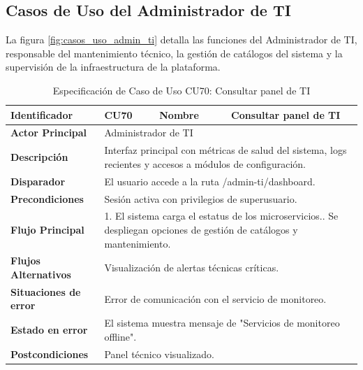 \subsection{Casos de Uso del Administrador de TI}
\label{subsec:casos_uso_admin_ti}

La figura \ref{fig:casos_uso_admin_ti} detalla las funciones del Administrador de TI, responsable del mantenimiento técnico, la gestión de catálogos del sistema y la supervisión de la infraestructura de la plataforma.


\vspace{0.5cm}

\begingroup
\setlength{\parskip}{0pt}
\begin{longtable}{|p{3.5cm}|p{2cm}|p{2.5cm}|p{7cm}|}
\caption{Especificación de Caso de Uso CU70: Consultar panel de TI}
\label{tab:cu70} \\
\hline
\textbf{Identificador} & CU70 & \textbf{Nombre} & Consultar panel de TI \\ \hline
\textbf{Actor Principal} & \multicolumn{3}{p{11.5cm}|}{Administrador de TI} \\ \hline
\textbf{Descripción} & \multicolumn{3}{p{11.5cm}|}{Interfaz principal con métricas de salud del sistema, logs recientes y accesos a módulos de configuración.} \\ \hline
\textbf{Disparador} & \multicolumn{3}{p{11.5cm}|}{El usuario accede a la ruta /admin-ti/dashboard.} \\ \hline
\textbf{Precondiciones} & \multicolumn{3}{p{11.5cm}|}{Sesión activa con privilegios de superusuario.} \\ \hline
\textbf{Flujo Principal} & \multicolumn{3}{p{11.5cm}|}{1. El sistema carga el estatus de los microservicios.\newline 2. Se despliegan opciones de gestión de catálogos y mantenimiento.} \\ \hline
\textbf{Flujos Alternativos} & \multicolumn{3}{p{11.5cm}|}{Visualización de alertas técnicas críticas.} \\ \hline
\textbf{Situaciones de error} & \multicolumn{3}{p{11.5cm}|}{Error de comunicación con el servicio de monitoreo.} \\ \hline
\textbf{Estado en error} & \multicolumn{3}{p{11.5cm}|}{El sistema muestra mensaje de "Servicios de monitoreo offline".} \\ \hline
\textbf{Postcondiciones} & \multicolumn{3}{p{11.5cm}|}{Panel técnico visualizado.} \\ \hline
\end{longtable}
\endgroup

